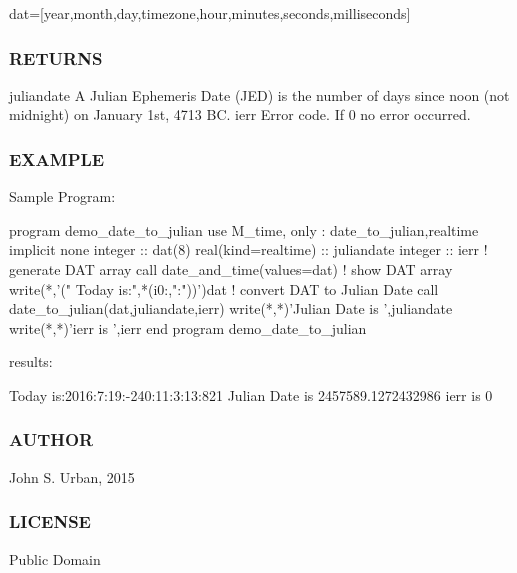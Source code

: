 dat=\mbox{[}year,month,day,timezone,hour,minutes,seconds,milliseconds\mbox{]} \subsubsection*{R\+E\+T\+U\+R\+NS}

juliandate A Julian Ephemeris Date (J\+ED) is the number of days since noon (not midnight) on January 1st, 4713 BC. ierr Error code. If 0 no error occurred.

\subsubsection*{E\+X\+A\+M\+P\+LE}

\begin{DoxyVerb}Sample Program:

 program demo_date_to_julian
 use M_time, only : date_to_julian,realtime
 implicit none
 integer             :: dat(8)
 real(kind=realtime) :: juliandate
 integer             :: ierr
    ! generate DAT array
    call date_and_time(values=dat)
    ! show DAT array
    write(*,'(" Today is:",*(i0:,":"))')dat
    ! convert DAT to Julian Date
    call date_to_julian(dat,juliandate,ierr)
    write(*,*)'Julian Date is ',juliandate
    write(*,*)'ierr is ',ierr
 end program demo_date_to_julian

results:

 Today is:2016:7:19:-240:11:3:13:821
 Julian Date is    2457589.1272432986
 ierr is            0
\end{DoxyVerb}


\subsubsection*{A\+U\+T\+H\+OR}

John S. Urban, 2015 \subsubsection*{L\+I\+C\+E\+N\+SE}

Public Domain


